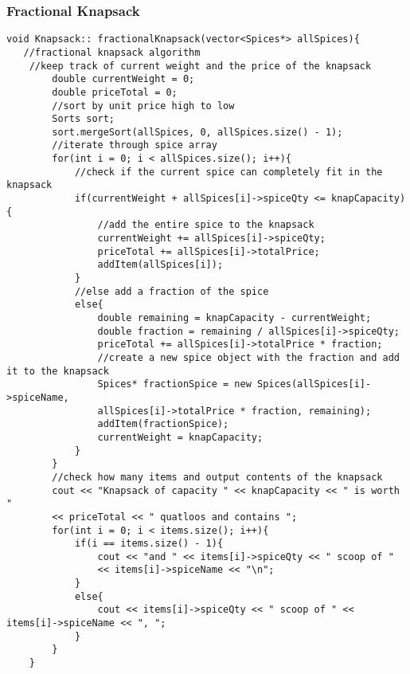 \documentclass[letterpaper, 10pt,DIV=13]{scrartcl}
\numberwithin{equation}{section} %
\numberwithin{figure}{section} %
\numberwithin{table}{section} %
\begin{document}
\subsubsection*{Fractional Knapsack}
    \lstset{numbers=left, numberstyle=\tiny, stepnumber=1, numbersep=5pt, basicstyle=\footnotesize\ttfamily}
    \begin{lstlisting}[frame=single, ]
   void Knapsack:: fractionalKnapsack(vector<Spices*> allSpices){ 
   //fractional knapsack algorithm
    //keep track of current weight and the price of the knapsack
        double currentWeight = 0;
        double priceTotal = 0;
        //sort by unit price high to low
        Sorts sort;
        sort.mergeSort(allSpices, 0, allSpices.size() - 1);
        //iterate through spice array
        for(int i = 0; i < allSpices.size(); i++){
            //check if the current spice can completely fit in the knapsack
            if(currentWeight + allSpices[i]->spiceQty <= knapCapacity){
                //add the entire spice to the knapsack
                currentWeight += allSpices[i]->spiceQty;
                priceTotal += allSpices[i]->totalPrice;
                addItem(allSpices[i]);
            }
            //else add a fraction of the spice
            else{
                double remaining = knapCapacity - currentWeight;
                double fraction = remaining / allSpices[i]->spiceQty;
                priceTotal += allSpices[i]->totalPrice * fraction;
                //create a new spice object with the fraction and add it to the knapsack
                Spices* fractionSpice = new Spices(allSpices[i]->spiceName, 
                allSpices[i]->totalPrice * fraction, remaining);
                addItem(fractionSpice);
                currentWeight = knapCapacity;
            }
        }
        //check how many items and output contents of the knapsack
        cout << "Knapsack of capacity " << knapCapacity << " is worth " 
        << priceTotal << " quatloos and contains ";
        for(int i = 0; i < items.size(); i++){
            if(i == items.size() - 1){
                cout << "and " << items[i]->spiceQty << " scoop of " 
                << items[i]->spiceName << "\n";
            }
            else{
                cout << items[i]->spiceQty << " scoop of " << items[i]->spiceName << ", ";
            }
        }
    }
\end{lstlisting}
\end{document}
